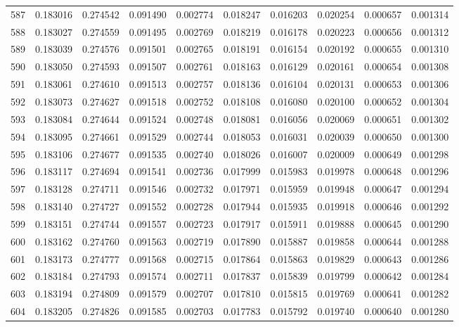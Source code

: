 \begin{tabular}{lrrrrrrrrr}
587 & 0.183016 & 0.274542 & 0.091490 & 0.002774 & 0.018247 & 0.016203 & 0.020254 & 0.000657 & 0.001314 \\
588 & 0.183027 & 0.274559 & 0.091495 & 0.002769 & 0.018219 & 0.016178 & 0.020223 & 0.000656 & 0.001312 \\
589 & 0.183039 & 0.274576 & 0.091501 & 0.002765 & 0.018191 & 0.016154 & 0.020192 & 0.000655 & 0.001310 \\
590 & 0.183050 & 0.274593 & 0.091507 & 0.002761 & 0.018163 & 0.016129 & 0.020161 & 0.000654 & 0.001308 \\
591 & 0.183061 & 0.274610 & 0.091513 & 0.002757 & 0.018136 & 0.016104 & 0.020131 & 0.000653 & 0.001306 \\
592 & 0.183073 & 0.274627 & 0.091518 & 0.002752 & 0.018108 & 0.016080 & 0.020100 & 0.000652 & 0.001304 \\
593 & 0.183084 & 0.274644 & 0.091524 & 0.002748 & 0.018081 & 0.016056 & 0.020069 & 0.000651 & 0.001302 \\
594 & 0.183095 & 0.274661 & 0.091529 & 0.002744 & 0.018053 & 0.016031 & 0.020039 & 0.000650 & 0.001300 \\
595 & 0.183106 & 0.274677 & 0.091535 & 0.002740 & 0.018026 & 0.016007 & 0.020009 & 0.000649 & 0.001298 \\
596 & 0.183117 & 0.274694 & 0.091541 & 0.002736 & 0.017999 & 0.015983 & 0.019978 & 0.000648 & 0.001296 \\
597 & 0.183128 & 0.274711 & 0.091546 & 0.002732 & 0.017971 & 0.015959 & 0.019948 & 0.000647 & 0.001294 \\
598 & 0.183140 & 0.274727 & 0.091552 & 0.002728 & 0.017944 & 0.015935 & 0.019918 & 0.000646 & 0.001292 \\
599 & 0.183151 & 0.274744 & 0.091557 & 0.002723 & 0.017917 & 0.015911 & 0.019888 & 0.000645 & 0.001290 \\
600 & 0.183162 & 0.274760 & 0.091563 & 0.002719 & 0.017890 & 0.015887 & 0.019858 & 0.000644 & 0.001288 \\
601 & 0.183173 & 0.274777 & 0.091568 & 0.002715 & 0.017864 & 0.015863 & 0.019829 & 0.000643 & 0.001286 \\
602 & 0.183184 & 0.274793 & 0.091574 & 0.002711 & 0.017837 & 0.015839 & 0.019799 & 0.000642 & 0.001284 \\
603 & 0.183194 & 0.274809 & 0.091579 & 0.002707 & 0.017810 & 0.015815 & 0.019769 & 0.000641 & 0.001282 \\
604 & 0.183205 & 0.274826 & 0.091585 & 0.002703 & 0.017783 & 0.015792 & 0.019740 & 0.000640 & 0.001280 \\

\end{tabular}
